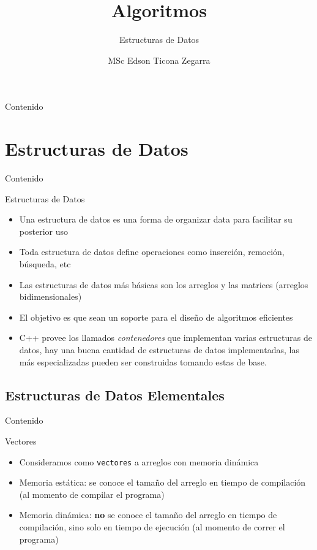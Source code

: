 \documentclass[]{beamer}
\title{Algoritmos}
\subtitle{Estructuras de Datos}
\author{MSc Edson Ticona Zegarra}
\institute{Campamento de Programaci\'on}
\date{}
\begin{document}
\maketitle

\begin{frame}{Contenido}
\tableofcontents
\end{frame}

\section{Estructuras de Datos}
\begin{frame}{Contenido}
\tableofcontents[currentsection]
\end{frame}

\begin{frame}{Estructuras de Datos}
  \begin{itemize}
    \item Una estructura de datos es una forma de organizar data para facilitar su posterior uso
      \pause
    \item Toda estructura de datos define operaciones como inserci\'on, remoci\'on, b\'usqueda, etc
      \pause
    \item Las estructuras de datos m\'as b\'asicas son los arreglos y las matrices (arreglos bidimensionales)
      \pause
    \item El objetivo es que sean un soporte para el dise\~no de algoritmos eficientes
      \pause
    \item C++ provee los llamados \textit{contenedores} que implementan varias estructuras de datos, hay una buena cantidad de estructuras de datos implementadas, las m\'as especializadas pueden ser construidas tomando estas de base.
  \end{itemize}
\end{frame}

\subsection{Estructuras de Datos Elementales}
\begin{frame}{Contenido}
\tableofcontents
\end{frame}

\begin{frame}{Vectores}
  \begin{itemize}
    \item Consideramos como \texttt{vectores} a arreglos con memoria din\'amica
      \pause
    \item Memoria est\'atica: se conoce el tama\~no del arreglo en tiempo de compilaci\'on (al momento de compilar el programa)
      \pause
    \item Memoria din\'amica: \textbf{no} se conoce el tama\~no del arreglo en tiempo de compilaci\'on, sino solo en tiempo de ejecuci\'on (al momento de correr el programa)
  \end{itemize}
\end{frame}
\end{document}
